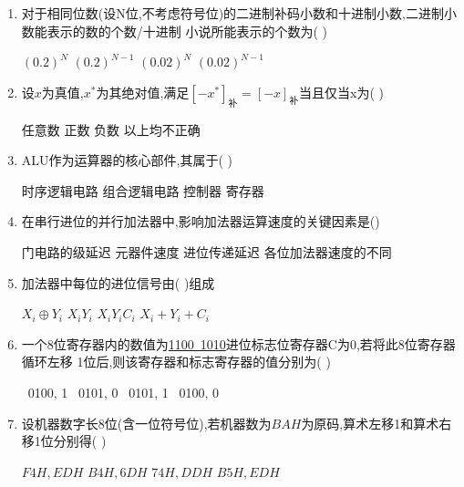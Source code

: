 \documentclass[12pt, a4paper, oneside, UTF8]{ctexbook}
\begin{document}
\begin{enumerate}
    \item 对于相同位数(设N位,不考虑符号位)的二进制补码小数和十进制小数,二进制小数能表示的数的个数/十进制
    小说所能表示的个数为(  )
    \begin{choices}
        \task $(0.2)^{N}$
        \task $(0.2)^{N-1}$
        \task $(0.02)^{N}$
        \task $(0.02)^{N-1}$ 
    \end{choices}
    

    \item 设$x$为真值,$x^{*}$为其绝对值,满足$[-x^*]_{\text{补}}=[-x]_{\text{补}}$当且仅当x为(   ) 
    \begin{choices}
        \task 任意数
        \task 正数 
        \task 负数 
        \task 以上均不正确
    \end{choices}
    

    \item ALU作为运算器的核心部件,其属于(   ) 
    \begin{choices}
        \task 时序逻辑电路
        \task 组合逻辑电路
        \task 控制器 
        \task 寄存器
    \end{choices}
    
    \item 在串行进位的并行加法器中,影响加法器运算速度的关键因素是() 
    \begin{choices}[2]
        \task 门电路的级延迟 
        \task 元器件速度 
        \task 进位传递延迟 
        \task 各位加法器速度的不同
    \end{choices}

    \item 加法器中每位的进位信号由(   )组成
    \begin{choices}
        \task $X_i\oplus Y_i$
        \task $X_iY_i$
        \task $X_iY_iC_i$
        \task $X_i+Y_i+C_i$
    \end{choices}
    

    \item 一个8位寄存器内的数值为\underline{1100\ 1010}进位标志位寄存器C为0,若将此8位寄存器循环左移
    1位后,则该寄存器和标志寄存器的值分别为(   ) 
    \begin{choices}
        \ 0100, 1
        \ 0101, 0
        \ 0101, 1
        \ 0100, 0
    \end{choices}
    

    \item 设机器数字长8位(含一位符号位),若机器数为$BAH$为原码,算术左移1和算术右移1位分别得(   ) 
    \begin{choices}
        \task $F4H,EDH$
        \task $B4H,6DH$
        \task $74H,DDH$
        \task $B5H,EDH$
    \end{choices}
    


\end{enumerate}
\end{document}
